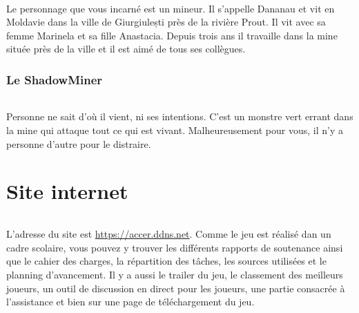 \documentclass[titlepage, 13px, a4paper]{report}
\begin{document}
\paragraph*{} \hspace{0pt}
Le personnage que vous incarné est un mineur. Il s'appelle Dananau et vit en Moldavie dans la ville 
de Giurgiulești près de la rivière Prout. Il vit avec sa femme Marinela et sa fille Anastacia. 
Depuis trois ans il travaille dans la mine située près de la ville et il est aimé de tous ses collègues. \\

\section{Le ShadowMiner}
\paragraph*{} \hspace{0pt}
Personne ne sait d'où il vient, ni ses intentions. C'est un monstre vert errant dans la mine qui attaque tout ce qui est vivant. 
Malheureusement pour vous, il n'y a personne d'autre pour le distraire. \\


\newpage


\part{Site internet} 
\paragraph*{} \hspace{0pt}
L'adresse du site est \url{https://accer.ddns.net}. Comme le jeu est réalisé dan un cadre scolaire, 
vous pouvez y trouver les différents rapports de soutenance ainsi que le cahier des charges, la 
répartition des tâches, les sources utilisées et le planning d'avancement. Il y a aussi le trailer 
du jeu, le classement des meilleurs joueurs, un outil de discussion en direct pour les joueurs,  
une partie consacrée à l'assistance et bien sur une page de téléchargement du jeu. \\


\newpage
\end{document}
